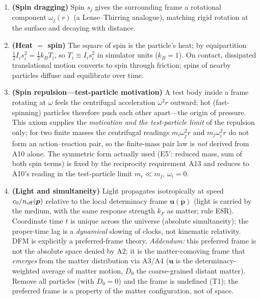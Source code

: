 \documentclass[aps,reprint,amsmath,amssymb,nofootinbib,superscriptaddress,floatfix]{revtex4-2}
\newcommand{\vect}[1]{\bm{#1}}
\newcommand{\Dz}{D_0}
\begin{document}
\begin{enumerate}
\item[A8.]{\bf (Spin dragging)} Spin $s_j$ gives the surrounding frame
a rotational component $\omega_j(r)$ (a Lense--Thirring analogue),
matching rigid rotation at the surface and decaying with distance.

\item[A9.]{\bf (Heat $=$ spin)} The square of spin is the particle's
heat; by equipartition $\tfrac12 I_i s_i^2 = \tfrac12 k_B T_i$, so
$T_i \equiv I_i s_i^2$ in simulator units ($k_B = 1$).
On contact, dissipated translational motion converts to spin through
friction; spins of nearby particles diffuse and equilibrate over time.

\item[A10.]{\bf (Spin repulsion---test-particle motivation)} A test
body inside a frame rotating at $\omega$ feels the centrifugal
acceleration $\omega^2 r$ outward; hot (fast-spinning) particles
therefore push each other apart---the origin of pressure.
This axiom supplies the \emph{motivation and the test-particle limit}
of the repulsion only; for two finite masses the centrifugal readings
$m_i\omega_j^2 r$ and $m_j\omega_i^2 r$ do not form an
action--reaction pair, so the finite-mass pair law is \emph{not}
derived from A10 alone.
The symmetric form actually used (E5$'$: reduced mass, sum of both
spin terms) is fixed by the reciprocity requirement A13 and reduces to
A10's reading in the test-particle limit
$m_i \ll m_j$, $\omega_i = 0$.

\item[A11.]{\bf (Light and simultaneity)} Light propagates
isotropically at speed $c_0/n_{\rm eff}(\vect{p})$ relative to the
local determinacy frame $\vect{u}(\vect{p})$ (light is carried by the
medium, with the same response strength $k_F$ as matter; rule E8R).
Coordinate time $t$ is unique across the universe (absolute
simultaneity); the proper-time lag is a \emph{dynamical} slowing of
clocks, not kinematic relativity.
DFM is explicitly a preferred-frame theory.
\emph{Addendum:} this preferred frame is not the absolute space denied
by A2; it is the matter-comoving frame that \emph{emerges} from the
matter distribution via A3/A4 ($\vect{u}$ is the determinacy-weighted
average of matter motion, $\Dz$ the coarse-grained distant matter).
Remove all particles (with $\Dz = 0$) and the frame is undefined (T1);
the preferred frame is a property of the matter configuration, not of
space.


\end{enumerate}
\end{document}
